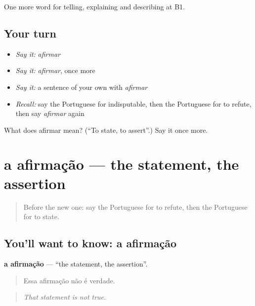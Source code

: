 \begin{grammarlens}[title={What you've built}]
One more word for telling, explaining and describing at B1.
\end{grammarlens}

\subsection*{Your turn}
\begin{itemize}
\raggedright
  \item \emph{Say it:} \emph{afirmar}
  \item \emph{Say it:} \emph{afirmar}, once more
  \item \emph{Say it:} a sentence of your own with \emph{afirmar}
  \item \emph{Recall:} say the Portuguese for indisputable, then the Portuguese for to refute, then say \emph{afirmar} again
\end{itemize}

\begin{tcolorbox}[breakable,colback=teal!4,colframe=teal!35!black,title={Before you move on}]
What does afirmar mean? (\textquotedblleft{}To state, to assert\textquotedblright{}.) Say it once more.
\end{tcolorbox}
\section[a afirmação]{a afirmação — the statement, the assertion}

\label{lesson:PT-C342-afirmacao}



\begin{quote}
Before the new one: say the Portuguese for to refute, then the Portuguese for to state.
\end{quote}

\subsection*{You'll want to know: a afirmação}
\textbf{a afirmação} — \textquotedblleft{}the statement, the assertion\textquotedblright{}.

\begin{quote}
Essa afirmação não é verdade.
\end{quote}

\begin{quote}
\emph{That statement is not true.}
\end{quote}

